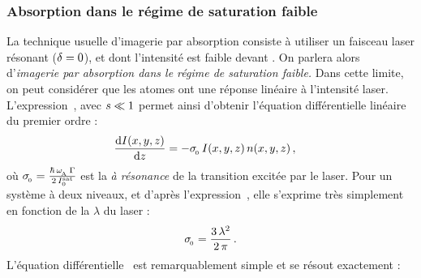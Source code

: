 \subsubsection{Absorption dans le régime de saturation faible}
La technique usuelle d'imagerie par absorption consiste à utiliser un faisceau laser résonant (${\delta}=0$), et dont l'intensité est faible devant \lintsat. On parlera alors d'\emph{imagerie par absorption dans le régime de saturation faible.} Dans cette limite, on peut considérer que les atomes ont une réponse linéaire à l'intensité laser.
L'expression~, avec ${s}\ll 1$ permet ainsi d'obtenir l'équation différentielle linéaire du premier ordre :
\begin{align}
	\Derive{\Ixyz}{z}
	& =
	- \seceff
	\, \Ixyz
	\, \densxyz
	\virguleformule
	\label{eq:EqDiffAbsBasseInt}
\end{align}
où ${\sigma_{_{\hspace{-1pt}{0}}}} = \frac{\hbar\,{\omega_{_{\hspace{-1pt}{\rm A}}}}\, {\Gamma}}{2\,{I^{\rm sat}_{0}}}$ %
%
est la \seff \emph{à résonance} de la transition excitée par le laser. Pour un système à deux niveaux, et d'après l'expression~, elle s'exprime très simplement en fonction de la \lo $\lambda$ du laser :
\[
{\sigma_{_{\hspace{-1pt}{0}}}} = \frac{3\,\lambda^2}{2\,\pi}
\, .
\]
%
L'équation différentielle~ est remarquablement simple et se résout exactement :
%
%
%
%


